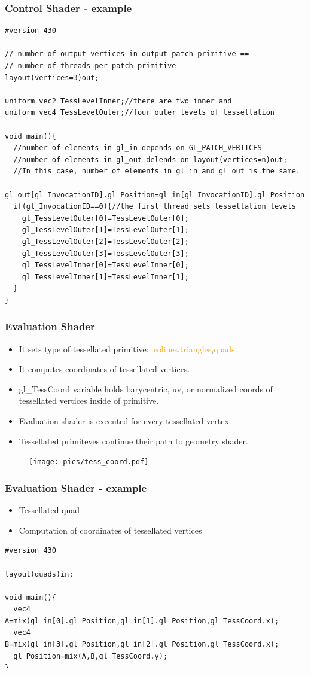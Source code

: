 \begin{frame}[fragile]
\frametitle{Control Shader - example}
	{\scriptsize
	\begin{verbatim}
#version 430

// number of output vertices in output patch primitive ==
// number of threads per patch primitive
layout(vertices=3)out;

uniform vec2 TessLevelInner;//there are two inner and
uniform vec4 TessLevelOuter;//four outer levels of tessellation

void main(){
  //number of elements in gl_in depends on GL_PATCH_VERTICES
  //number of elements in gl_out delends on layout(vertices=n)out;
  //In this case, number of elements in gl_in and gl_out is the same.
  gl_out[gl_InvocationID].gl_Position=gl_in[gl_InvocationID].gl_Position;//copy
  if(gl_InvocationID==0){//the first thread sets tessellation levels
    gl_TessLevelOuter[0]=TessLevelOuter[0];
    gl_TessLevelOuter[1]=TessLevelOuter[1];
    gl_TessLevelOuter[2]=TessLevelOuter[2];
    gl_TessLevelOuter[3]=TessLevelOuter[3];
    gl_TessLevelInner[0]=TessLevelInner[0];
    gl_TessLevelInner[1]=TessLevelInner[1];
  }
}
	\end{verbatim}
	}
\end{frame}

\begin{frame}
\frametitle{Evaluation Shader}
	\begin{itemize}
		\item It sets type of tessellated primitive: \textcolor{Orange}{isolines},\textcolor{orange}{triangles},\textcolor{orange}{quads}
		\item It computes coordinates of tessellated vertices.
		\item \textcolor{OliveGreen}{gl\_TessCoord} variable holds barycentric, uv, or normalized coords of tessellated vertices inside of primitive.
		\item Evaluation shader is executed for every tessellated vertex.
		\item Tessellated primiteves continue their path to geometry shader.
	\end{itemize}
	\begin{figure}[h]
	\texttt{[image: pics/tess\_coord.pdf]}
	\end{figure}
\end{frame}


\begin{frame}[fragile]
\frametitle{Evaluation Shader - example}
	\begin{itemize}
		\item Tessellated quad
		\item Computation of coordinates of tessellated vertices
	\end{itemize}
	{\scriptsize
	\begin{verbatim}
#version 430

layout(quads)in;

void main(){
  vec4 A=mix(gl_in[0].gl_Position,gl_in[1].gl_Position,gl_TessCoord.x);
  vec4 B=mix(gl_in[3].gl_Position,gl_in[2].gl_Position,gl_TessCoord.x);
  gl_Position=mix(A,B,gl_TessCoord.y);
}
	\end{verbatim}
	}
\end{frame}


